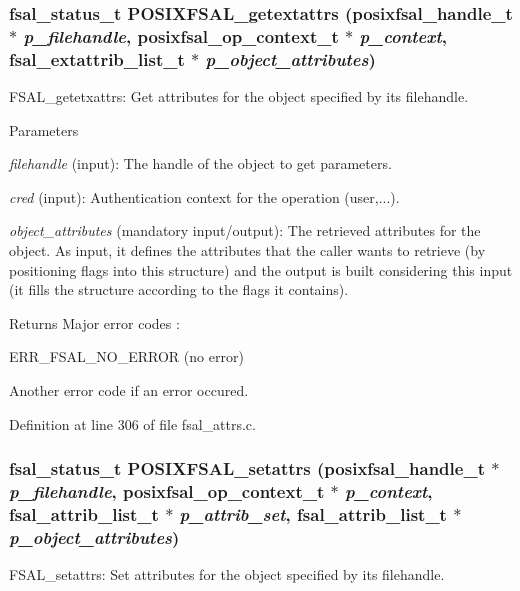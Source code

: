 \subsubsection[{POSIXFSAL\_\-getextattrs}]{\setlength{\rightskip}{0pt plus 5cm}fsal\_\-status\_\-t POSIXFSAL\_\-getextattrs (posixfsal\_\-handle\_\-t $\ast$ {\em p\_\-filehandle}, \/  posixfsal\_\-op\_\-context\_\-t $\ast$ {\em p\_\-context}, \/  fsal\_\-extattrib\_\-list\_\-t $\ast$ {\em p\_\-object\_\-attributes})}\label{fsal__attrs_8c_a8d0b6c77ef008b8438a1a23e5fa594a7}
FSAL\_\-getetxattrs: Get attributes for the object specified by its filehandle.


\begin{DoxyParams}{Parameters}
\item[{\em filehandle}](input): The handle of the object to get parameters. \item[{\em cred}](input): Authentication context for the operation (user,...). \item[{\em object\_\-attributes}](mandatory input/output): The retrieved attributes for the object. As input, it defines the attributes that the caller wants to retrieve (by positioning flags into this structure) and the output is built considering this input (it fills the structure according to the flags it contains).\end{DoxyParams}
\begin{DoxyReturn}{Returns}
Major error codes :
\begin{DoxyItemize}
\item ERR\_\-FSAL\_\-NO\_\-ERROR (no error)
\item Another error code if an error occured. 
\end{DoxyItemize}
\end{DoxyReturn}


Definition at line 306 of file fsal\_\-attrs.c.
\subsubsection[{POSIXFSAL\_\-setattrs}]{\setlength{\rightskip}{0pt plus 5cm}fsal\_\-status\_\-t POSIXFSAL\_\-setattrs (posixfsal\_\-handle\_\-t $\ast$ {\em p\_\-filehandle}, \/  posixfsal\_\-op\_\-context\_\-t $\ast$ {\em p\_\-context}, \/  fsal\_\-attrib\_\-list\_\-t $\ast$ {\em p\_\-attrib\_\-set}, \/  fsal\_\-attrib\_\-list\_\-t $\ast$ {\em p\_\-object\_\-attributes})}\label{fsal__attrs_8c_a88f8c2a7e6ad07495f02ec2882093d9a}
FSAL\_\-setattrs: Set attributes for the object specified by its filehandle.


